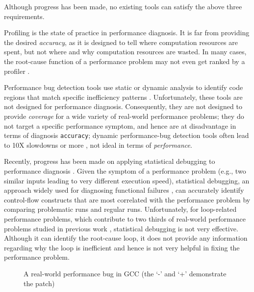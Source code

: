 Although progress has been made, no existing tools can satisfy the above
three requirements.

Profiling is the state of practice in performance diagnosis.
It is far from providing the desired \textit{accuracy}, as it is designed to
tell where computation resources are spent, 
but not where and why computation resources are wasted. 
In many cases, the root-cause function of a performance problem may not even
get ranked by a profiler \cite{SongOOPSLA2014}.

Performance bug detection tools use static or dynamic analysis to identify
code regions that match specific inefficiency patterns 
\cite{Alabama,CARAMEL, Cachetor,Xu:2010:FLD:1806596.1806617,Dufour:2008:STC:1453101.1453111, Xu:2009:GFP:1542476.1542523, Xu:2010:DIC:1806596.1806616}. 
Unfortunately, these tools are not designed for performance diagnosis.
Consequently, they are not designed to provide \textit{coverage} for a wide
variety of real-world performance problems; they do not target a specific
performance symptom, and hence are at disadvantage in terms of diagnosis
\texttt{accuracy}; dynamic performance-bug detection tools often lead to 
10X slowdowns or more \cite{Cachetor,Xu:2010:FLD:1806596.1806617,Alabama}, 
not ideal in terms of \textit{performance}.

Recently, progress has been made on applying statistical debugging to 
performance diagnosis \cite{SongOOPSLA2014}. Given the symptom of 
a performance problem (e.g., two similar inputs leading to very
different execution speed),
statistical debugging, an approach widely used for diagnosing
functional failures \cite{liblit03,liblit05,tarantula1}, can
accurately identify control-flow constructs that are most correlated with
the performance problem by comparing problematic runs and regular runs.
Unfortunately, for loop-related 
performance problems, which contribute to two thirds of
real-world performance problems studied in previous work 
\cite{SongOOPSLA2014,PerfBug}, statistical debugging is not very effective.
Although it can identify the root-cause loop, it does not provide any 
information regarding why the loop is inefficient and hence is not very helpful
in fixing the performance problem.

\begin{figure}
\centering
{}
  \mbox{}
\caption{A real-world performance bug in GCC (the `-' and `+' demonstrate the patch)}
\label{fig:GCC27733}
\end{figure}

